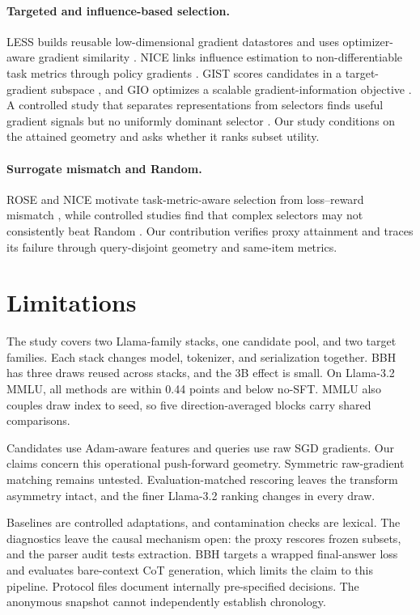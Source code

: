 \documentclass{article}
\begin{document}
\paragraph{Targeted and influence-based selection.}
LESS builds reusable low-dimensional gradient datastores and uses
optimizer-aware gradient similarity \citep{xia2024less}. NICE links influence
estimation to non-differentiable task metrics through policy gradients
\citep{wang2025nice}. GIST scores candidates in a target-gradient subspace
\citep{min2026gist}, and GIO optimizes a scalable gradient-information
objective \citep{everaert2024gio}. A controlled study that separates
representations from selectors finds useful gradient signals but no uniformly
dominant selector \citep{nayak2026critical}. Our study conditions on the
attained geometry and asks whether it ranks subset utility.

\paragraph{Surrogate mismatch and Random.}
ROSE and NICE motivate task-metric-aware selection from loss--reward mismatch
\citep{wu2025rose,wang2025nice}, while controlled studies find that complex
selectors may not consistently beat Random
\citep{diddee2025chasing,xia2025random}. Our contribution verifies proxy
attainment and traces its failure through query-disjoint geometry and
same-item metrics.

\section{Limitations}
\label{sec:limitations}

The study covers two Llama-family stacks, one candidate pool, and two target
families.
Each stack changes model, tokenizer, and serialization together. BBH has three
draws reused across stacks, and the 3B effect is small. On Llama-3.2 MMLU, all
methods are within 0.44 points and below no-SFT. MMLU also couples draw index
to seed, so five direction-averaged blocks carry shared comparisons.

Candidates use Adam-aware features and queries use raw SGD gradients. Our
claims concern this operational push-forward geometry. Symmetric raw-gradient
matching remains untested. Evaluation-matched rescoring leaves the transform
asymmetry intact, and the finer Llama-3.2 ranking changes in every draw.

Baselines are controlled adaptations, and contamination checks are lexical.
The diagnostics leave the causal mechanism open: the proxy rescores frozen
subsets, and the parser audit tests extraction. BBH targets a wrapped
final-answer loss and evaluates bare-context CoT generation, which limits the
claim to this pipeline. Protocol files document internally pre-specified
decisions. The anonymous snapshot cannot independently establish chronology.
\end{document}
